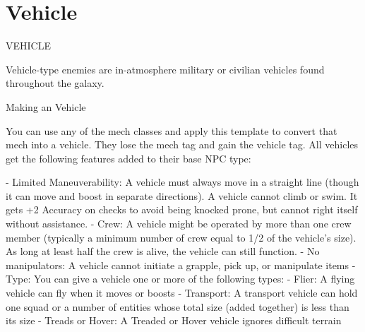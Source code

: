 \section{Vehicle}
                                                VEHICLE   

Vehicle-type enemies are in-atmosphere military or civilian vehicles found throughout the galaxy. 
 

Making an Vehicle
 
You can use any of the mech classes and apply this template to convert that mech into a vehicle.  
They lose the mech tag and gain the vehicle tag. All vehicles get the following features added to  
their base NPC type:
 
    -    Limited Maneuverability: A vehicle must always move in a straight line (though it can  
         move and boost in separate directions). A vehicle cannot climb or swim. It gets +2  
        Accuracy on checks to avoid being knocked prone, but cannot right itself without  
        assistance.  
    -   Crew: A vehicle might be operated by more than one crew member (typically a minimum  
         number of crew equal to 1/2 of the vehicle’s size). As long at least half the crew is alive, the  
        vehicle can still function.  
    -    No manipulators: A vehicle cannot initiate a grapple, pick up, or manipulate items  
    -   Type: You can give a vehicle one or more of the following types:  
             -   Flier: A flying vehicle can fly when it moves or boosts  
             -   Transport: A transport vehicle can hold one squad or a number of entities whose  
                 total size (added together) is less than its size  
             -   Treads or Hover: A Treaded or Hover vehicle ignores difficult terrain  